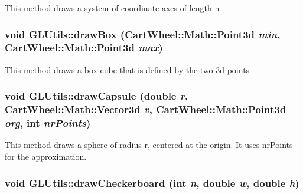 \label{classCartWheel_1_1GL_1_1GLUtils_af963104ed3a61b0bff025f4e0f45f41b}
This method draws a system of coordinate axes of length n \hypertarget{classCartWheel_1_1GL_1_1GLUtils_ab72d0390a1e79c0e814a23ca00740fa6}{
\subsubsection[{drawBox}]{\setlength{\rightskip}{0pt plus 5cm}void GLUtils::drawBox ({\bf CartWheel::Math::Point3d} {\em min}, \/  {\bf CartWheel::Math::Point3d} {\em max})}}
\label{classCartWheel_1_1GL_1_1GLUtils_ab72d0390a1e79c0e814a23ca00740fa6}
This method draws a box cube that is defined by the two 3d points \hypertarget{classCartWheel_1_1GL_1_1GLUtils_a2b5bffa837b2d397e14bfb6dcc5f8cd6}{
\subsubsection[{drawCapsule}]{\setlength{\rightskip}{0pt plus 5cm}void GLUtils::drawCapsule (double {\em r}, \/  {\bf CartWheel::Math::Vector3d} {\em v}, \/  {\bf CartWheel::Math::Point3d} {\em org}, \/  int {\em nrPoints})}}
\label{classCartWheel_1_1GL_1_1GLUtils_a2b5bffa837b2d397e14bfb6dcc5f8cd6}
This method draws a sphere of radius r, centered at the origin. It uses nrPoints for the approximation. \hypertarget{classCartWheel_1_1GL_1_1GLUtils_ac6cdc06205424c564337ea4506057f45}{
\subsubsection[{drawCheckerboard}]{\setlength{\rightskip}{0pt plus 5cm}void GLUtils::drawCheckerboard (int {\em n}, \/  double {\em w}, \/  double {\em h})}}
\label{classCartWheel_1_1GL_1_1GLUtils_ac6cdc06205424c564337ea4506057f45}
